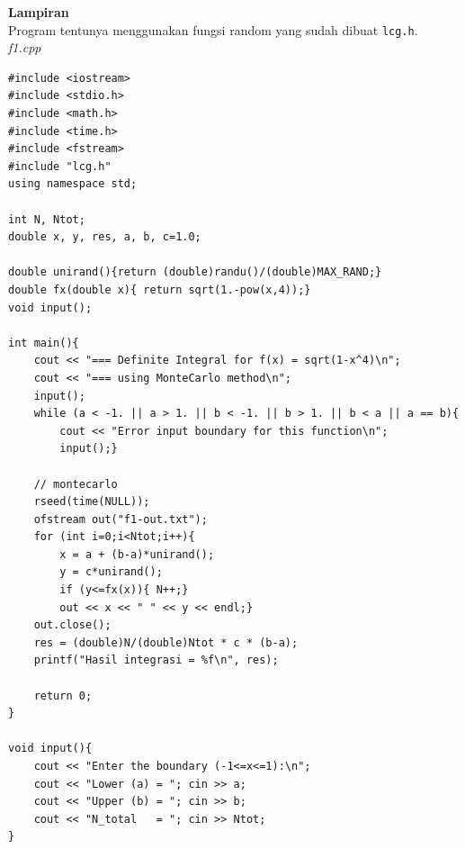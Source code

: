 \documentclass[paper=a4, fontsize=11pt]{scrartcl}
\numberwithin{equation}{section} %
\numberwithin{figure}{section} %
\numberwithin{table}{section} %
\begin{document}
\newpage
\textbf{Lampiran}\\
Program tentunya menggunakan fungsi random yang sudah dibuat \texttt{lcg.h}.\\
\textit{f1.cpp}
\lstset{frameround=fttt}
\begin{lstlisting}
#include <iostream>
#include <stdio.h>
#include <math.h>
#include <time.h>
#include <fstream>
#include "lcg.h"
using namespace std;

int N, Ntot;
double x, y, res, a, b, c=1.0;

double unirand(){return (double)randu()/(double)MAX_RAND;}
double fx(double x){ return sqrt(1.-pow(x,4));}
void input();

int main(){
    cout << "=== Definite Integral for f(x) = sqrt(1-x^4)\n"; 
    cout << "=== using MonteCarlo method\n";    
    input();
    while (a < -1. || a > 1. || b < -1. || b > 1. || b < a || a == b){
        cout << "Error input boundary for this function\n";
        input();}
    
    // montecarlo
    rseed(time(NULL));
    ofstream out("f1-out.txt");
    for (int i=0;i<Ntot;i++){
        x = a + (b-a)*unirand();
        y = c*unirand();
        if (y<=fx(x)){ N++;}
        out << x << " " << y << endl;}
    out.close();
    res = (double)N/(double)Ntot * c * (b-a);
    printf("Hasil integrasi = %f\n", res);

    return 0;
}

void input(){   
    cout << "Enter the boundary (-1<=x<=1):\n";
    cout << "Lower (a) = "; cin >> a;
    cout << "Upper (b) = "; cin >> b;
    cout << "N_total   = "; cin >> Ntot;
}
\end{lstlisting}
\end{document}
